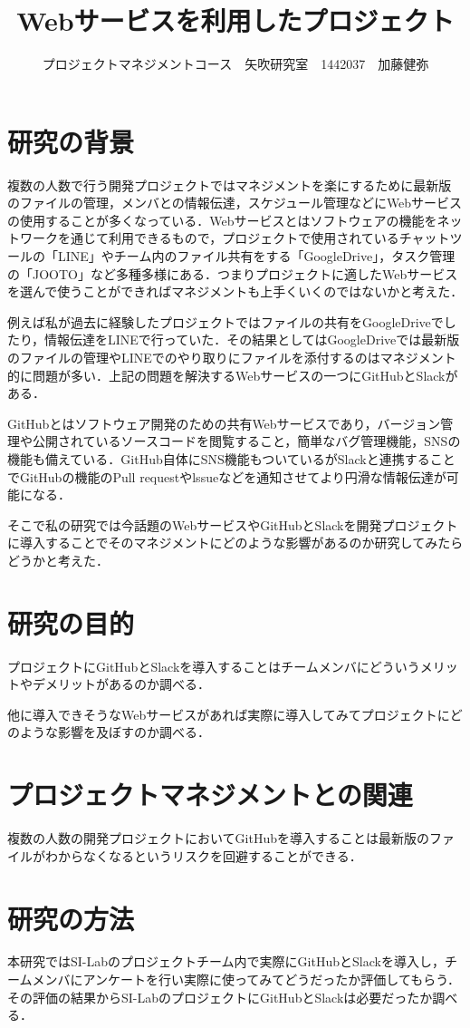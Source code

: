 \documentclass[uplatex,twocolumn,dvipdfmx]{jsarticle}
\title{\vspace{-5mm}\fontsize{14pt}{0pt}\selectfont Webサービスを利用したプロジェクト}
\author{\normalsize プロジェクトマネジメントコース　矢吹研究室　1442037　加藤健弥}
\date{}
\begin{document}
\fontsize{10.5pt}{\baselineskip}\selectfont
\maketitle





\section{研究の背景}
複数の人数で行う開発プロジェクトではマネジメントを楽にするために最新版のファイルの管理，メンバとの情報伝達，スケジュール管理などにWebサービスの使用することが多くなっている．Webサービスとはソフトウェアの機能をネットワークを通じて利用できるもので，プロジェクトで使用されているチャットツールの「LINE」やチーム内のファイル共有をする「GoogleDrive」，タスク管理の「JOOTO」など多種多様にある\cite{01}．つまりプロジェクトに適したWebサービスを選んで使うことができればマネジメントも上手くいくのではないかと考えた．

例えば私が過去に経験したプロジェクトではファイルの共有をGoogleDriveでしたり，情報伝達をLINEで行っていた．その結果としてはGoogleDriveでは最新版のファイルの管理やLINEでのやり取りにファイルを添付するのはマネジメント的に問題が多い．上記の問題を解決するWebサービスの一つにGitHubとSlackがある．

GitHubとはソフトウェア開発のための共有Webサービスであり，バージョン管理や公開されているソースコードを閲覧すること，簡単なバグ管理機能，SNSの機能も備えている\cite{03}．GitHub自体にSNS機能もついているがSlackと連携することでGitHubの機能のPull requestやlssueなどを通知させてより円滑な情報伝達が可能になる．

そこで私の研究では今話題のWebサービスやGitHubとSlackを開発プロジェクトに導入することでそのマネジメントにどのような影響があるのか研究してみたらどうかと考えた．
\section{研究の目的}
プロジェクトにGitHubとSlackを導入することはチームメンバにどういうメリットやデメリットがあるのか調べる．

他に導入できそうなWebサービスがあれば実際に導入してみてプロジェクトにどのような影響を及ぼすのか調べる．
\section{プロジェクトマネジメントとの関連}
複数の人数の開発プロジェクトにおいてGitHubを導入することは最新版のファイルがわからなくなるというリスクを回避することができる\cite{02}．
\section{研究の方法}
本研究ではSI-Labのプロジェクトチーム内で実際にGitHubとSlackを導入し，チームメンバにアンケートを行い実際に使ってみてどうだったか評価してもらう．その評価の結果からSI-LabのプロジェクトにGitHubとSlackは必要だったか調べる．

\end{document}
